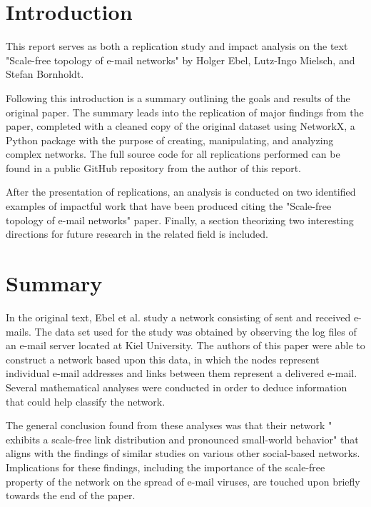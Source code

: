 \documentclass[a4paper]{article}
\begin{document}
\begin{multicols}{2}

\section{Introduction}
\hspace*{\parindent}This report serves as both a replication study and impact analysis on the text "Scale-free topology of e-mail networks" \cite{1} by Holger Ebel, Lutz-Ingo Mielsch, and Stefan Bornholdt. 

Following this introduction is a summary outlining the goals and results of the original paper. The summary leads into the replication of major findings from the paper, completed with a cleaned copy of the original dataset using NetworkX, a Python package with the purpose of creating, manipulating, and analyzing complex networks. The full source code for all replications performed can be found in a public GitHub repository \cite{2} from the author of this report. 

After the presentation of replications, an analysis is conducted on two identified examples of impactful work that have been produced citing the "Scale-free topology of e-mail networks" paper. Finally, a section theorizing two interesting directions for future research in the related field is included.

\section{Summary}
\hspace*{\parindent}In the original text, Ebel et al. study a network consisting of sent and received e-mails. The data set used for the study was obtained by observing the log files of an e-mail server located at Kiel University. The authors of this paper were able to construct a network based upon this data, in which the nodes represent individual e-mail addresses and links between them represent a delivered e-mail. Several mathematical analyses were conducted in order to deduce information that could help classify the network. 

The general conclusion found from these analyses was that their network " exhibits a scale-free link distribution and pronounced small-world behavior" \cite{1} that aligns with the findings of similar studies on various other social-based networks. Implications for these findings, including the importance of the scale-free property of the network on the spread of e-mail viruses, are touched upon briefly towards the end of the paper. 


\end{multicols}
\end{document}
